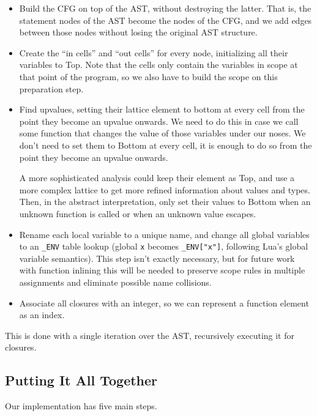\documentclass[
]{article}
\begin{document}
\begin{itemize}
\item
  Build the CFG on top of the AST, without destroying the latter. That
  is, the statement nodes of the AST become the nodes of the CFG, and we
  add edges between those nodes without losing the original AST
  structure.
\item
  Create the ``in cells'' and ``out cells'' for every node, initializing
  all their variables to Top. Note that the cells only contain the
  variables in scope at that point of the program, so we also have to
  build the scope on this preparation step.
\item
  Find upvalues, setting their lattice element to bottom at every cell
  from the point they become an upvalue onwards. We need to do this in
  case we call some function that changes the value of those variables
  under our noses. We don't need to set them to Bottom at every cell, it
  is enough to do so from the point they become an upvalue onwards.

  A more sophisticated analysis could keep their element as Top, and use
  a more complex lattice to get more refined information about values
  and types. Then, in the abstract interpretation, only set their values
  to Bottom when an unknown function is called or when an unknown value
  escapes.
\item
  Rename each local variable to a unique name, and change all global
  variables to an \texttt{\_ENV} table lookup (global \texttt{x} becomes
  \texttt{\_ENV{[}"x"{]}}, following Lua's global variable semantics).
  This step isn't exactly necessary, but for future work with function
  inlining this will be needed to preserve scope rules in multiple
  assignments and eliminate possible name collisions.
\item
  Associate all closures with an integer, so we can represent a function
  element as an index.
\end{itemize}

This is done with a single iteration over the AST, recursively executing
it for closures.

\hypertarget{putting-it-all-together}{%
\subsection{Putting It All Together}\label{putting-it-all-together}}

Our implementation has five main steps.
\end{document}
